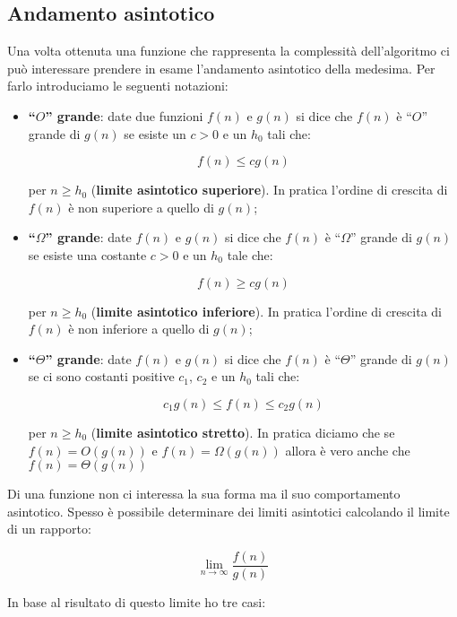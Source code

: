 \subsection{Andamento asintotico}

Una volta ottenuta una funzione che rappresenta la complessità dell'algoritmo ci può interessare prendere in esame l'andamento asintotico della medesima. Per farlo introduciamo le seguenti notazioni:

\begin{itemize}

\item \textbf{``$O$'' grande}: date due funzioni $f(n)$ e $g(n)$ si dice che $f(n)$ è ``$O$'' grande di $g(n)$ se esiste un $c>0$ e un $h_0$ tali che: 

$$f(n)\le cg(n)$$ 

per $n\ge h_0$ (\textbf{limite asintotico superiore}). In pratica l'ordine di crescita di $f(n)$ è non superiore a quello di $g(n)$;

\item \textbf{``$\Omega$'' grande}: date $f(n)$ e $g(n)$ si dice che $f(n)$ è ``$\Omega$'' grande di $g(n)$ se esiste una costante $c>0$ e un $h_0$ tale che:

$$f(n)\ge cg(n)$$ 

per $n\ge h_0$ (\textbf{limite asintotico inferiore}). In pratica l'ordine di crescita di $f(n)$ è non inferiore a quello di $g(n)$;

\item \textbf{``$\Theta$'' grande}: date $f(n)$ e $g(n)$ si dice che $f(n)$ è ``$\Theta$'' grande di $g(n)$ se ci sono costanti positive $c_1$, $c_2$ e un $h_0$ tali che:

$$c_1g(n)\le f(n) \le c_2g(n)$$

per $n\ge h_0$ (\textbf{limite asintotico stretto}). In pratica diciamo che se $f(n)=O(g(n))$ e $f(n)=\Omega(g(n))$ allora è vero anche che $f(n)=\Theta(g(n))$

\end{itemize}

Di una funzione non ci interessa la sua forma ma il suo comportamento asintotico. Spesso è possibile determinare dei limiti asintotici calcolando il limite di un rapporto:

$$\lim_{n \to \infty} \frac{f(n)}{g(n)}$$

In base al risultato di questo limite ho tre casi:


